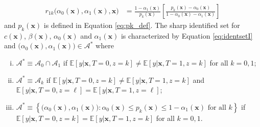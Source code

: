 \begin{thm}
\begin{align*}
  r_{1k}\big(\alpha_0(\mathbf{x}),\alpha_1(\mathbf{x}),\mathbf{x}\big) &= \frac{1 - \alpha_1(\mathbf{x})}{p_k(\mathbf{x})} \left[ \frac{p_k(\mathbf{x}) - \alpha_0(\mathbf{x})}{1 - \alpha_0(\mathbf{x}) - \alpha_1(\mathbf{x})} \right]
\end{align*}
and $p_k(\mathbf{x})$ is defined in Equation \ref{eq:pk_def}.
The sharp identified set for $c(\mathbf{x})$, $\beta(\mathbf{x})$, $\alpha_0(\mathbf{x})$ and $\alpha_1(\mathbf{x})$ is characterized by Equation
\ref{eq:identsetI} and $\big(\alpha_0(\mathbf{x}), \alpha_1(\mathbf{x})\big) \in \mathcal{A}^*$ where
\begin{enumerate}[(i)]
  \item $\mathcal{A}^* \equiv \mathcal{A}_0 \cap \mathcal{A}_1$ if $\mathbb{E}[y|\mathbf{x},T=0,z=k] \neq \mathbb{E}[y|\mathbf{x},T=1,z=k]$ for all $k=0,1$;
  \item $\mathcal{A}^* \equiv \mathcal{A}_k$ if $\mathbb{E}[y|\mathbf{x},T=0,z=k] \neq \mathbb{E}[y|\mathbf{x},T=1,z=k]$ and $\mathbb{E}[y|\mathbf{x},T=0,z=\ell] = \mathbb{E}[y|\mathbf{x},T=1,z=\ell]$;
  \item $\mathcal{A}^* \equiv \left\{ \big(\alpha_0(\mathbf{x}), \alpha_1(\mathbf{x})\big)\colon \alpha_0(\mathbf{x}) \leq p_k(\mathbf{x}) \leq 1 - \alpha_1(\mathbf{x}) \mbox{ for all } k \right\}$ if $\mathbb{E}[y|\mathbf{x},T=0,z=k] = \mathbb{E}[y|\mathbf{x},T=1,z=k]$ for all $k=0,1$.
\end{enumerate}
\end{thm}


